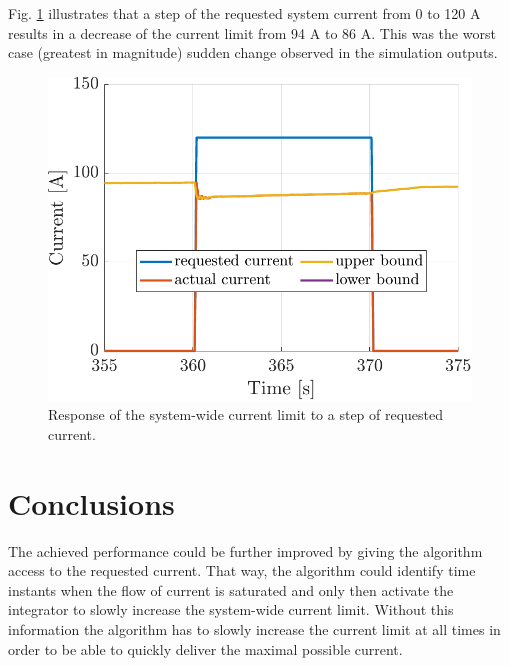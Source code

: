 Fig. \ref{fig:13-fb-system-detail} illustrates that a step of the requested system current from 0 to 120 A results in a decrease of the current limit from 94 A to 86 A. This was the worst case (greatest in magnitude) sudden change observed in the simulation outputs.

\begin{figure}
    \centering
    \includegraphics[width=0.5\linewidth]{figures/13/fb-system-detail.pdf}
    \caption{Response of the system-wide current limit to a step of requested current.}
    \label{fig:13-fb-system-detail}
\end{figure}

\section{Conclusions}

The achieved performance could be further improved by giving the algorithm access to the requested current. That way, the algorithm could identify time instants when the flow of current is saturated and only then activate the integrator to slowly increase the system-wide current limit. Without this information the algorithm has to slowly increase the current limit at all times in order to be able to quickly deliver the maximal possible current.

